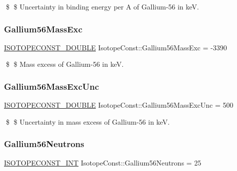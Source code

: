 \$ \$ Uncertainty in binding energy per A of Gallium-\/56 in keV. \mbox{\label{group___isotope_const-_gallium-_ga56_gab4e7313f6495910194301fc757dcfdf9}} 
\subsubsection{\texorpdfstring{Gallium56\+Mass\+Exc}{Gallium56MassExc}}
{\footnotesize\ttfamily \mbox{\hyperlink{group___isotope_const-_macros_ga8f45a7272ce02c0b4c65c44636ed719a}{I\+S\+O\+T\+O\+P\+E\+C\+O\+N\+S\+T\+\_\+\+D\+O\+U\+B\+LE}} Isotope\+Const\+::\+Gallium56\+Mass\+Exc = -\/3390}

\$ \$ Mass excess of Gallium-\/56 in keV. \mbox{\label{group___isotope_const-_gallium-_ga56_ga1157c6c82081a12c100e1f26c1e2c0c2}} 
\subsubsection{\texorpdfstring{Gallium56\+Mass\+Exc\+Unc}{Gallium56MassExcUnc}}
{\footnotesize\ttfamily \mbox{\hyperlink{group___isotope_const-_macros_ga8f45a7272ce02c0b4c65c44636ed719a}{I\+S\+O\+T\+O\+P\+E\+C\+O\+N\+S\+T\+\_\+\+D\+O\+U\+B\+LE}} Isotope\+Const\+::\+Gallium56\+Mass\+Exc\+Unc = 500}

\$ \$ Uncertainty in mass excess of Gallium-\/56 in keV. \mbox{\label{group___isotope_const-_gallium-_ga56_gaff304c9da2047a9d14482d515ba63533}} 
\subsubsection{\texorpdfstring{Gallium56\+Neutrons}{Gallium56Neutrons}}
{\footnotesize\ttfamily \mbox{\hyperlink{group___isotope_const-_macros_ga5f18360b3e99483a35c32d789e62621c}{I\+S\+O\+T\+O\+P\+E\+C\+O\+N\+S\+T\+\_\+\+I\+NT}} Isotope\+Const\+::\+Gallium56\+Neutrons = 25}

